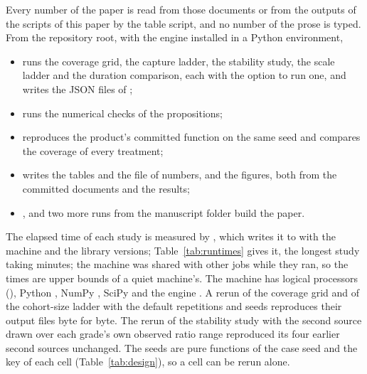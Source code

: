 Every number of the paper is read from those documents or from the outputs of the scripts of this paper by the table script, and no number of the prose is typed. From the repository root, with the engine installed in a Python environment,
\begin{itemize}
\item {} runs the coverage grid, the capture ladder, the stability study, the scale ladder and the duration comparison, each with the option  to run one, and writes the JSON files of ;
\item {} runs the numerical checks of the propositions;
\item {} reproduces the product's committed function on the same seed and compares the coverage of every treatment;
\item {} writes the tables and the file of numbers, and  the figures, both from the committed documents and the results;
\item {},  and two more  runs from the manuscript folder build the paper.
\end{itemize}
The elapsed time of each study is measured by , which writes it to  with the machine and the library versions; Table~\ref{tab:runtimes} gives it, the longest study taking  minutes; the machine was shared with other jobs while they ran, so the times are upper bounds of a quiet machine's. The machine has  logical processors (), Python , NumPy , SciPy  and the engine . A rerun of the coverage grid and of the cohort-size ladder with the default repetitions and seeds reproduces their output files byte for byte. The rerun of the stability study with the second source drawn over each grade's own observed ratio range reproduced its four earlier second sources unchanged. The seeds are pure functions of the case seed  and the key of each cell (Table~\ref{tab:design}), so a cell can be rerun alone.


